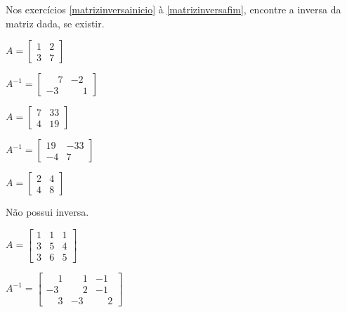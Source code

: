\documentclass[12pt]{exam}
\begin{document}
Nos exercícios \ref{matrizinversainicio} à \ref{matrizinversafim}, encontre a inversa da matriz dada, se existir.

\begin{exercicio}\label{matrizinversainicio}
  $
    A =\begin{bmatrix}
        1 & 2\\
        3 & 7
    \end{bmatrix}
  $
  \begin{solucao}
    $A^{-1} =\begin{bmatrix}
      \phantom{-} 7 & -2\\
      -3 & \phantom{-} 1
    \end{bmatrix}$
  \end{solucao}
\end{exercicio}

\begin{exercicio}
  $
    A =\begin{bmatrix}
        7 & 33\\
        4 & 19
    \end{bmatrix}
  $
  \begin{solucao}
    $A^{-1} =\begin{bmatrix}
      19 & -33\\
      -4 & 7
    \end{bmatrix}$
  \end{solucao}
\end{exercicio}

\begin{exercicio}
  $
    A =\begin{bmatrix}
        2 & 4\\
        4 & 8
    \end{bmatrix}
  $
  \begin{solucao}
    Não possui inversa.
  \end{solucao}
\end{exercicio}

\begin{exercicio}
  $
    A =\begin{bmatrix}
        1 & 1 & 1\\
        3 & 5 & 4\\
        3 & 6 & 5
      \end{bmatrix}
    $
  \begin{solucao}
    $
      A^{-1} =\begin{bmatrix}
        \phantom{-} 1 & \phantom{-} 1 & -1\\
        -3 & \phantom{-} 2 & -1\\
        \phantom{-} 3 & -3 & \phantom{-} 2
      \end{bmatrix}
    $
  \end{solucao}
\end{exercicio}
\end{document}
